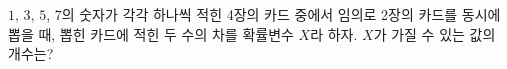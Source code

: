 $1$, $3$, $5$, $7$의 숫자가 각각 하나씩 적힌 4장의 카드 중에서 임의로 2장의 카드를 동시에 뽑을 때, 뽑힌 카드에 적힌 두 수의 차를 확률변수 $X$라 하자. $X$가 가질 수 있는 값의 개수는?
